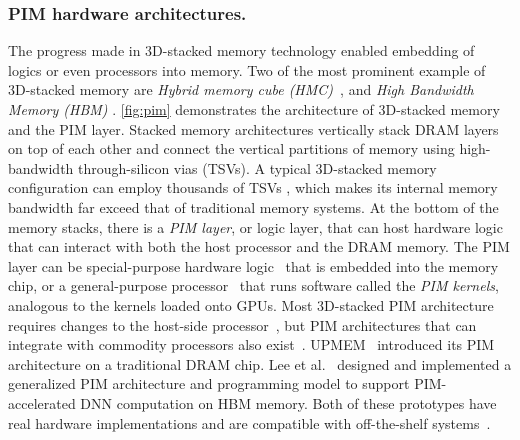 \subsubsection{PIM hardware architectures.}
The progress made in 3D-stacked memory technology enabled embedding of logics or even processors into memory. Two of the most prominent example of 3D-stacked memory are \emph{Hybrid memory cube (HMC)}~\cite{hmc}, and \emph{High Bandwidth Memory (HBM)} \cite{amd-hbm,samsung-pim}. \autoref{fig:pim} demonstrates the architecture of 3D-stacked memory and the PIM layer. Stacked memory architectures vertically stack DRAM layers on top of each other and connect the vertical partitions of memory using high-bandwidth through-silicon vias (TSVs). A typical 3D-stacked memory configuration can employ thousands of TSVs \cite{primer-on-pim}, which makes its internal memory bandwidth far exceed that of traditional memory systems. At the bottom of the memory stacks, there is a \emph{PIM layer}, or logic layer, that can host hardware logic that can interact with both the host processor and the DRAM memory. The PIM layer can be special-purpose hardware logic~\cite{invisimem,prime} that is embedded into the memory chip, or a general-purpose processor~\cite{upmem,samsung-pim,smcsim,pim-architecture} that runs software called the \emph{PIM kernels}, analogous to the kernels loaded onto GPUs. Most 3D-stacked PIM architecture requires changes to the host-side processor~\cite{pim-architecture}, but PIM architectures that can integrate with commodity processors also exist~\cite{upmem,upmem-atc,pim-architecture}. UPMEM~\cite{upmem} introduced its PIM architecture on a traditional DRAM chip. Lee et al.~\cite{pim-architecture} designed and implemented a generalized PIM architecture and programming model to support PIM-accelerated DNN computation on HBM memory. Both of these prototypes have real hardware implementations and are compatible with off-the-shelf systems~\cite{upmem-atc,pim-architecture}.





